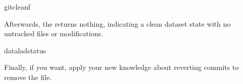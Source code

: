 \begin{sphinxVerbatim}[commandchars=\\\{\}]
gitclean\PYGZhy{}f
\end{sphinxVerbatim}

\sphinxAtStartPar
Afterwards, the  returns nothing, indicating a
clean dataset state with no untracked files or modifications.

\begin{sphinxVerbatim}[commandchars=\\\{\}]
dataladstatus
\end{sphinxVerbatim}

\sphinxAtStartPar
Finally, if you want, apply your new knowledge about reverting commits
to remove the  file.

\sphinxstepscope

\ignorespaces 


